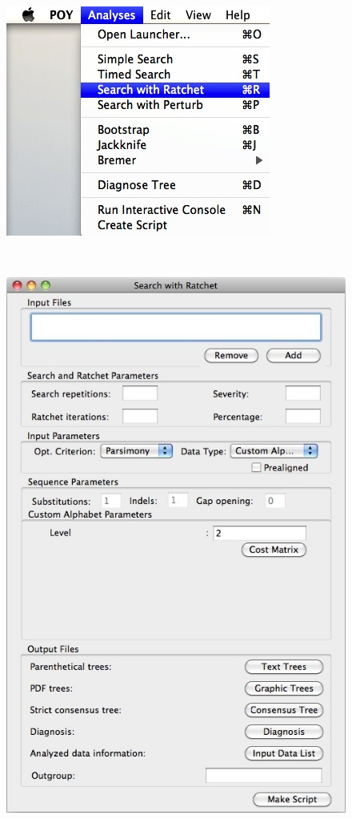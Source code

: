 {\begin{figure}
\centering
\begin{minipage}[c]{0.45\textwidth}
\includegraphics[width=\textwidth]{doc/figures/searchwithratchet_menu.jpg}
\end{minipage}
\,
\begin{minipage}[c]{0.52\textwidth}
\includegraphics[width=\textwidth]{doc/figures/searchwithratchet_window.jpg}

\end{minipage}
\end{figure}}
